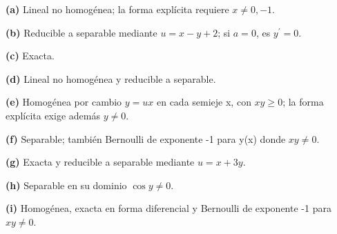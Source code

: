 \noindent\textbf{(a)} Lineal no homogénea; la forma explícita requiere $x\ne0,-1$.

\noindent\textbf{(b)} Reducible a separable mediante $u=x-y+2$; si $a=0$, es $y^{\prime}=0$.

\noindent\textbf{(c)} Exacta.

\noindent\textbf{(d)} Lineal no homogénea y reducible a separable.

\noindent\textbf{(e)} Homogénea por cambio $y=ux$ en cada semieje x, con $xy\ge0$; la forma explícita exige además $y\ne0$.

\noindent\textbf{(f)} Separable; también Bernoulli de exponente -1 para y(x) donde $xy\ne0$.

\noindent\textbf{(g)} Exacta y reducible a separable mediante $u=x+3y$.

\noindent\textbf{(h)} Separable en su dominio $\cos y\ne0$.

\noindent\textbf{(i)} Homogénea, exacta en forma diferencial y Bernoulli de exponente -1 para $xy\ne0$.
